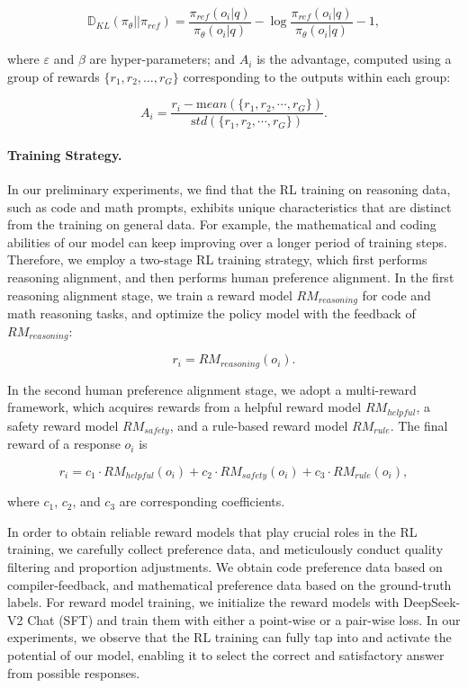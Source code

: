 \begin{equation}
    \mathbb{D}_{KL}\left(\pi_{\theta} || \pi_{ref}\right) = \frac{\pi_{ref}(o_i|q)}{\pi_{\theta}(o_i|q)}- \log\frac{\pi_{ref}(o_i|q)}{\pi_{\theta}(o_i|q)} - 1,
\end{equation}

where $\varepsilon$ and $\beta$ are hyper-parameters; and $A_i$ is the advantage, computed using a group of rewards $\{r_1, r_2, \ldots, r_G\}$ corresponding to the outputs within each group:

\begin{equation}
    A_i = \frac{r_i - {\mathrm mean(\{r_1, r_2, \cdots, r_G\})}}{{\mathrm std(\{r_1, r_2, \cdots, r_G\})}}.
\end{equation}

\paragraph{Training Strategy.} In our preliminary experiments, we find that the RL training on reasoning data, such as code and math prompts, exhibits unique characteristics that are distinct from the training on general data. For example, the mathematical and coding abilities of our model can keep improving over a longer period of training steps. Therefore, we employ a two-stage RL training strategy, which first performs reasoning alignment, and then performs human preference alignment. In the first reasoning alignment stage, we train a reward model $RM_{reasoning}$ for code and math reasoning tasks, and optimize the policy model with the feedback of $RM_{reasoning}$:

\begin{equation}
    r_i=RM_{reasoning}(o_i). 
\end{equation}

In the second human preference alignment stage, we adopt a multi-reward framework, which acquires rewards from a helpful reward model $RM_{helpful}$, a safety reward model $RM_{safety}$, and a rule-based reward model $RM_{rule}$. The final reward of a response $o_i$ is

\begin{equation}
    r_i = c_1 \cdot RM_{helpful}(o_i) + c_2 \cdot RM_{safety}(o_i) + c_3 \cdot RM_{rule}(o_i), 
\end{equation}

where $c_1$, $c_2$, and $c_3$ are corresponding coefficients. 

In order to obtain reliable reward models that play crucial roles in the RL training, we carefully collect preference data, and meticulously conduct quality filtering and proportion adjustments. We obtain code preference data based on compiler-feedback, and mathematical preference data based on the ground-truth labels. For reward model training, we initialize the reward models with DeepSeek-V2 Chat (SFT) and train them with either a point-wise or a pair-wise loss. In our experiments, we observe that the RL training can fully tap into and activate the potential of our model, enabling it to select the correct and satisfactory answer from possible responses. 

